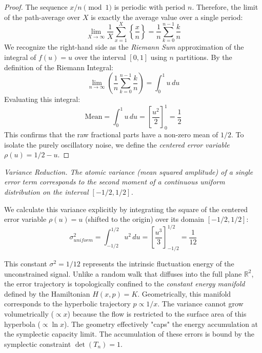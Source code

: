 \documentclass[sn-mathphys-num, pdflatex]{sn-jnl}
\begin{document}
\begin{proof}
The sequence $x/n \pmod 1$ is periodic with period $n$. Therefore, the limit of the path-average over $X$ is exactly the average value over a single period:
\begin{equation}
\lim_{X \to \infty} \frac{1}{X} \sum_{x=1}^{X} \left\{\frac{x}{n}\right\} = \frac{1}{n} \sum_{k=0}^{n-1} \frac{k}{n}
\end{equation}
We recognize the right-hand side as the \textit{Riemann Sum} approximation of the integral of $f(u)=u$ over the interval $[0,1]$ using $n$ partitions. By the definition of the Riemann Integral:
\begin{equation}
\lim_{n \to \infty} \left( \frac{1}{n} \sum_{k=0}^{n-1} \frac{k}{n} \right) = \int_0^1 u \, du
\end{equation}
Evaluating this integral:
\begin{equation}
\text{Mean} = \int_0^1 u \, du = \left[ \frac{u^2}{2} \right]_0^1 = \frac{1}{2}
\end{equation}
This confirms that the raw fractional parts have a non-zero mean of $1/2$. To isolate the purely oscillatory noise, we define the \textit{centered error variable} $\rho(u) = 1/2 - u$.
\end{proof}

\textit{\textit{Variance Reduction.} \label{Variance Reduction}
The atomic variance (mean squared amplitude) of a single error term corresponds to the second moment of a continuous uniform distribution on the interval $[-1/2, 1/2]$.}

We calculate this variance explicitly by integrating the square of the centered error variable $\rho(u) = u$ (shifted to the origin) over its domain $[-1/2, 1/2]$:
\begin{equation}
\sigma^2_{uniform} = \int_{-1/2}^{1/2} u^2 \, du = \left[ \frac{u^3}{3} \right]_{-1/2}^{1/2} = \frac{1}{12}
\label{variance}
\end{equation}

This constant $\sigma^2 = 1/12$ represents the intrinsic fluctuation energy of the unconstrained signal. Unlike a random walk that diffuses into the full plane $\mathbb{R}^2$, the error trajectory is topologically confined to the \textit{constant energy manifold} defined by the Hamiltonian $H(x,p) = K$. Geometrically, this manifold corresponds to the hyperbolic trajectory $p \propto 1/x$. The variance cannot grow volumetrically ($ \propto x$) because the flow is restricted to the surface area of this hyperbola ($ \propto \ln x$). The geometry effectively "caps" the energy accumulation at the symplectic capacity limit. The accumulation of these errors is bound by the symplectic constraint $\det(T_n)=1$. 
\end{document}

